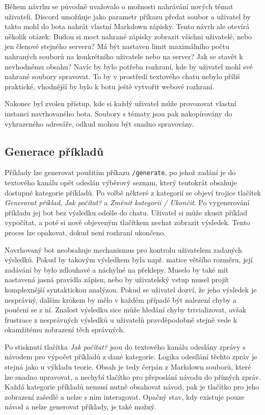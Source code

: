 \documentclass[FM]{tulthesis}
\begin{document}
	Během návrhu se původně uvažovalo o možnosti nahrávání nových témat uživateli. Discord umožňuje jako parametr příkazu předat soubor a uživatel by takto mohl do bota nahrát vlastní Markdown zápisky. Tento návrh ale otevírá několik otázek: Budou si moct nahrané zápisky zobrazit všichni uživatelé, nebo jen členové stejného serveru? Má být nastaven limit maximálního počtu nahraných souborů na konkrétního uživatele nebo na server? Jak se stavět k nevhodnému obsahu? Navíc by bylo potřeba rozhraní, kde by uživatel mohl své nahrané soubory spravovat. To by v prostředí textového chatu nebylo příliš praktické, vhodnější by bylo k botu ještě vytvořit webové rozhraní.
	
	Nakonec byl zvolen přístup, kde si každý uživatel může provozovat vlastní instanci navrhovaného bota. Soubory s tématy jsou pak nakopírovány do vyhrazeného adresáře, odkud mohou být snadno spravovány.
	
	\subsection{Generace příkladů} %
	
	Příklady lze generovat použitím příkazu \verb|/generate|, po jehož zadání je do textového kanálu opět odeslán výběrový seznam, který tentokrát obsahuje dostupné kategorie příkladů. Po volbě některé z kategorií se objeví trojice tlačítek \textit{Generovat příklad}, \textit{Jak počítat?} a \textit{Změnit kategorii / Ukončit}. Po vygenerování příkladu jej bot bez výsledku odešle do chatu. Uživatel si může zkusit příklad vypočítat, a poté si nově objeveným tlačítkem nechat zobrazit výsledek. Tento proces lze opakovat, dokud není rozhraní ukončeno.
	
	Navrhovaný bot neobsahuje mechanismus pro kontrolu uživatelem zadaných výsledků. Pokud by takovým výsledkem byla např. matice většího rozměru, její zadávání by bylo zdlouhavé a náchylné na překlepy. Muselo by také mít nastavená jasná pravidla zápisu, nebo by uživatelský vstup musel projít komplexnější syntaktickou analýzou. Pokud se uživatel dozví, že jeho výsledek je nesprávný, dalším krokem by mělo v každém případě být nalezení chyby a poučení se z ní. Znalost výsledku sice může hledání chyby trivializovat, avšak frustrace z nesprávných výsledků u uživatelů pravděpodobně stejně vede k okamžitému zobrazení těch správných.
	
	Po stisknutí tlačítka \textit{Jak počítat?} jsou do textového kanálu odeslány zprávy s návodem pro výpočet příkladů z dané kategorie. Logika odesílání těchto zpráv je stejná jako u výkladu teorie. Obsah je tedy čerpán z Markdown souborů, které lze snadno upravovat, a nechybí tlačítko pro přeposlání návodu do přímých zpráv. Každá kategorie příkladů nemusí nutně obsahovat návod, pak je tlačítko pro jeho zobrazení zašedlé a nelze s ním interagovat. Opačný stav, kdy existuje pouze návod a nelze generovat příklady, je také možný.
	
\end{document}
